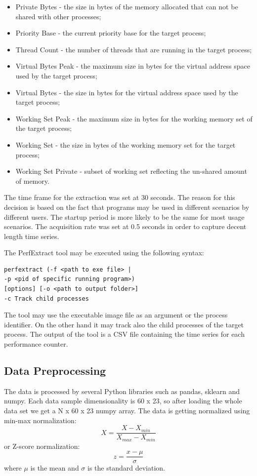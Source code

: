 \documentclass[conference]{IEEEtran}
\begin{document}
\begin{itemize}
\item Private Bytes - the size in bytes of the memory allocated that can not be shared with other processes;
\item Priority Base - the current priority base for the target process;
\item Thread Count - the number of threads that are running in the target process;
\item Virtual Bytes Peak - the maximum size in bytes for the virtual address space used by the target process;
\item Virtual Bytes - the size in bytes for the virtual address space used by the target process;
\item Working Set Peak - the maximum size in bytes for the working memory set of the target process;
\item Working Set - the size in bytes of the working memory set for the target process;
\item Working Set Private - subset of working set reflecting the un-shared amount of memory.
\end{itemize}

The time frame for the extraction was set at 30 seconds. The reason for this decision is based on the fact that programs may be used in different scenarios by different users. The startup period is more likely to be the same for most usage scenarios. The acquisition rate was set at 0.5 seconds in order to capture decent length time series.

The PerfExtract tool may be executed using the following syntax:
\begin{verbatim}
perfextract (-f <path to exe file> | 
-p <pid of specific running program>) 
[options] [-o <path to output folder>]
-c Track child processes    
\end{verbatim}

The tool may use the executable image file as an argument or the process identifier.
On the other hand it may track also the child processes of the target process.
The output of the tool is a CSV file containing the time series for each performance counter.

\subsection{Data Preprocessing}\label{sub:DP}
The data is processed by several Python libraries such as pandas, sklearn and numpy. Each data sample dimensionality is 60 x 23, so after loading the whole data set we get a N x 60 x 23 numpy array. The data is getting normalized using min-max normalization:
\[X = \frac{X - X_{min}}{X_{max} - X_{min}}\]
or Z-score normalization:
\[z=\frac{x-\mu}{\sigma}\]
where \(\mu\) is the mean and \(\sigma\) is the standard deviation.
\end{document}
